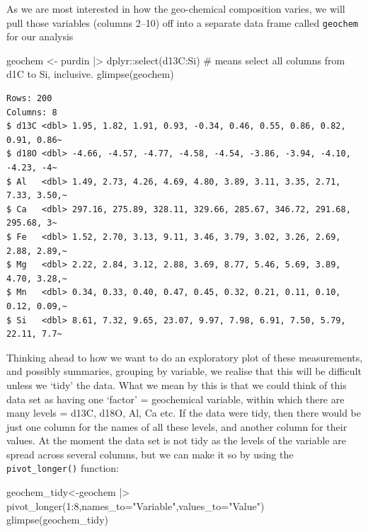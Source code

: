 \documentclass[
  letterpaper,
  DIV=11,
  numbers=noendperiod]{scrreprt}
\newenvironment{Shaded}{\begin{snugshade}}{\end{snugshade}}
\newcommand{\AttributeTok}[1]{\textcolor[rgb]{0.40,0.45,0.13}{#1}}
\newcommand{\CommentTok}[1]{\textcolor[rgb]{0.37,0.37,0.37}{#1}}
\newcommand{\DecValTok}[1]{\textcolor[rgb]{0.68,0.00,0.00}{#1}}
\newcommand{\FunctionTok}[1]{\textcolor[rgb]{0.28,0.35,0.67}{#1}}
\newcommand{\NormalTok}[1]{\textcolor[rgb]{0.00,0.23,0.31}{#1}}
\newcommand{\OtherTok}[1]{\textcolor[rgb]{0.00,0.23,0.31}{#1}}
\newcommand{\SpecialCharTok}[1]{\textcolor[rgb]{0.37,0.37,0.37}{#1}}
\newcommand{\StringTok}[1]{\textcolor[rgb]{0.13,0.47,0.30}{#1}}
\begin{document}
As we are most interested in how the geo-chemical composition varies, we
will pull those variables (columns 2--10) off into a separate data frame
called \texttt{geochem} for our analysis

\begin{Shaded}
\begin{Highlighting}[]
\NormalTok{geochem }\OtherTok{\textless{}{-}}\NormalTok{ purdin }\SpecialCharTok{|\textgreater{}}
\NormalTok{  dplyr}\SpecialCharTok{::}\FunctionTok{select}\NormalTok{(d13C}\SpecialCharTok{:}\NormalTok{Si) }\CommentTok{\# means select all columns from d1C to Si, inclusive.}
\FunctionTok{glimpse}\NormalTok{(geochem)}
\end{Highlighting}
\end{Shaded}

\begin{verbatim}
Rows: 200
Columns: 8
$ d13C <dbl> 1.95, 1.82, 1.91, 0.93, -0.34, 0.46, 0.55, 0.86, 0.82, 0.91, 0.86~
$ d18O <dbl> -4.66, -4.57, -4.77, -4.58, -4.54, -3.86, -3.94, -4.10, -4.23, -4~
$ Al   <dbl> 1.49, 2.73, 4.26, 4.69, 4.80, 3.89, 3.11, 3.35, 2.71, 7.33, 3.50,~
$ Ca   <dbl> 297.16, 275.89, 328.11, 329.66, 285.67, 346.72, 291.68, 295.68, 3~
$ Fe   <dbl> 1.52, 2.70, 3.13, 9.11, 3.46, 3.79, 3.02, 3.26, 2.69, 2.88, 2.89,~
$ Mg   <dbl> 2.22, 2.84, 3.12, 2.88, 3.69, 8.77, 5.46, 5.69, 3.89, 4.70, 3.28,~
$ Mn   <dbl> 0.34, 0.33, 0.40, 0.47, 0.45, 0.32, 0.21, 0.11, 0.10, 0.12, 0.09,~
$ Si   <dbl> 8.61, 7.32, 9.65, 23.07, 9.97, 7.98, 6.91, 7.50, 5.79, 22.11, 7.7~
\end{verbatim}

Thinking ahead to how we want to do an exploratory plot of these
measurements, and possibly summaries, grouping by variable, we realise
that this will be difficult unless we `tidy' the data. What we mean by
this is that we could think of this data set as having one `factor' =
geochemical variable, within which there are many levels = d13C, d18O,
Al, Ca etc. If the data were tidy, then there would be just one column
for the names of all these levels, and another column for their values.
At the moment the data set is not tidy as the levels of the variable are
spread across several columns, but we can make it so by using the
\texttt{pivot\_longer()} function:

\begin{Shaded}
\begin{Highlighting}[]
\NormalTok{geochem\_tidy}\OtherTok{\textless{}{-}}\NormalTok{geochem }\SpecialCharTok{|\textgreater{}}
  \FunctionTok{pivot\_longer}\NormalTok{(}\DecValTok{1}\SpecialCharTok{:}\DecValTok{8}\NormalTok{,}\AttributeTok{names\_to=}\StringTok{"Variable"}\NormalTok{,}\AttributeTok{values\_to=}\StringTok{"Value"}\NormalTok{)}
\FunctionTok{glimpse}\NormalTok{(geochem\_tidy)}
\end{Highlighting}
\end{Shaded}
\end{document}
